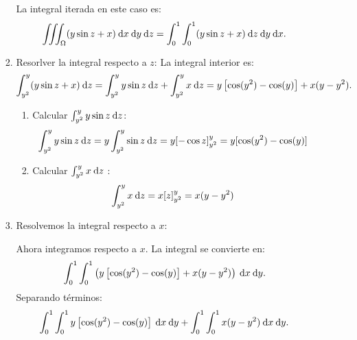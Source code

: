 \begin{enumerate}[label=\color{red}\textbf{\arabic*)}, leftmargin=*]
\begin{enumerate}[label=\color{red}\textbf{\alph*)}]
\begin{enumerate}[label=\arabic*)]
  La integral iterada en este caso es: \[
  \iiint_\Omega(y\sin z+x)\:\mathrm{d}x \:\mathrm{d}y \:\mathrm{d}z =\int_{0}^{1} \int_{0}^{1} (y\sin z+x)\:\mathrm{d}z \:\mathrm{d}y \:\mathrm{d}x.   
  \] 
\item Resorlver la integral respecto a $z$:
  La integral interior es:  \[
  \int_{y^2}^{y} (y\sin z+x)\:\mathrm{d}z=\int_{y^2}^{y} y\sin z\:\mathrm{d}z +\int_{y^2}^{y} x\:\mathrm{d}z =y\left[ \cos(y^2)-\cos(y) \right] + x(y-y^2).    
  \] 
  \begin{enumerate}[label=\alph*)]
    \item Calcular $\int_{y^2}^{y} y\sin z\:\mathrm{d}z  $: \[
        \int_{y^2}^{y} y\sin z\:\mathrm{d}z =y \int_{y^2}^{y} \sin z\:\mathrm{d}z =y[-\cos z]_{y^2}^y=y[\cos(y^2)-\cos(y)]  
    \] 
  \item Calcular $\int_{y^2}^{y} x\:\mathrm{d}z $ : \[
      \int_{y^2}^{y} x\:\mathrm{d}z =x[z]_{y^2}^y=x(y-y^2)
  \] 
  \end{enumerate} 
\item Resolvemos la integral respecto a $x$:
  
  Ahora integramos respecto a  $x$. La integral se convierte en:  \[
    \int_{0}^{1} \int_{0}^{1} \left( y\left[ \cos(y^2)-\cos(y) \right] +x(y-y^2) \right)\:\mathrm{d}x \:\mathrm{d}y  .
  \] 
  Separando términos: \[
  \int_{0}^{1} \int_{0}^{1} y\left[ \cos(y^2)-\cos(y) \right] \:\mathrm{d}x \:\mathrm{d}y +\int_{0}^{1} \int_{0}^{1} x(y-y^2)\:\mathrm{d}x \:\mathrm{d}y .    
  \] 
\end{enumerate}
\end{enumerate}
\end{enumerate}
